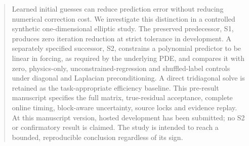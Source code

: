 \begin{abstract}
Learned initial guesses can reduce prediction error without reducing numerical correction cost. We investigate this distinction in a controlled synthetic one-dimensional elliptic study. The preserved predecessor, S1, produces zero iteration reduction at strict tolerance in development. A separately specified successor, S2, constrains a polynomial predictor to be linear in forcing, as required by the underlying PDE, and compares it with zero, physics-only, unconstrained-regression and shuffled-label controls under diagonal and Laplacian preconditioning. A direct tridiagonal solve is retained as the task-appropriate efficiency baseline. This pre-result manuscript specifies the full matrix, true-residual acceptance, complete online timing, block-aware uncertainty, source locks and evidence replay. At this manuscript version, hosted development has been submitted; no S2 or confirmatory result is claimed. The study is intended to reach a bounded, reproducible conclusion regardless of its sign.
\end{abstract}
